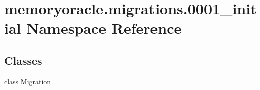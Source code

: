 \hypertarget{namespacememoryoracle_1_1migrations_1_10001__initial}{}\section{memoryoracle.\+migrations.0001\+\_\+initial Namespace Reference}
\label{namespacememoryoracle_1_1migrations_1_10001__initial}
\subsection*{Classes}
\begin{DoxyCompactItemize}
\item 
class \hyperlink{classmemoryoracle_1_1migrations_1_10001__initial_1_1Migration}{Migration}
\end{DoxyCompactItemize}
